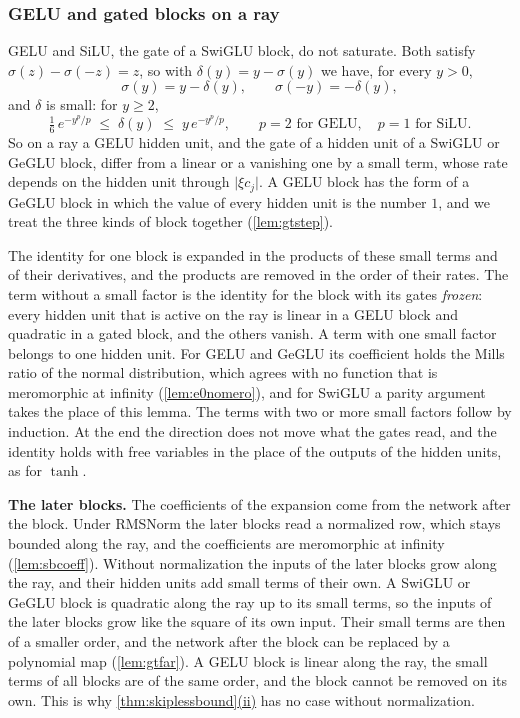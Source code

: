 \documentclass[10pt]{article}
\theoremstyle{definition}
\theoremstyle{remark}
\newcommand{\para}[1]{\smallskip\noindent\textbf{#1}\hspace{0.5em}}
\DeclareRobustCommand{\cpref}[2]{\hyperref[#1:#2]{\cref*{#1}(#2)}}
\begin{document}
\subsubsection*{GELU and gated blocks on a ray}

GELU and SiLU, the gate of a SwiGLU block, do not saturate. Both satisfy $\sigma(z) - \sigma(-z) = z$, so with $\delta(y) = y - \sigma(y)$ we have, for every $y > 0$,
\[
\sigma(y) = y - \delta(y), \qquad \sigma(-y) = -\delta(y),
\]
and $\delta$ is small: for $y \ge 2$,
\[
\tfrac16\,e^{-y^p/p} \;\le\; \delta(y) \;\le\; y\,e^{-y^p/p}, \qquad p = 2 \text{ for GELU}, \quad p = 1 \text{ for SiLU} .
\]
So on a ray a GELU hidden unit, and the gate of a hidden unit of a SwiGLU or GeGLU block, differ from a linear or a vanishing one by a small term, whose rate depends on the hidden unit through $\lvert\xi c_j\rvert$. A GELU block has the form of a GeGLU block in which the value of every hidden unit is the number $1$, and we treat the three kinds of block together (\cref{lem:gtstep}).

The identity for one block is expanded in the products of these small terms and of their derivatives, and the products are removed in the order of their rates. The term without a small factor is the identity for the block with its gates \emph{frozen}: every hidden unit that is active on the ray is linear in a GELU block and quadratic in a gated block, and the others vanish. A term with one small factor belongs to one hidden unit. For GELU and GeGLU its coefficient holds the Mills ratio of the normal distribution, which agrees with no function that is meromorphic at infinity (\cref{lem:e0nomero}), and for SwiGLU a parity argument takes the place of this lemma. The terms with two or more small factors follow by induction. At the end the direction does not move what the gates read, and the identity holds with free variables in the place of the outputs of the hidden units, as for $\tanh$.

\para{The later blocks.} The coefficients of the expansion come from the network after the block. Under RMSNorm the later blocks read a normalized row, which stays bounded along the ray, and the coefficients are meromorphic at infinity (\cref{lem:sbcoeff}). Without normalization the inputs of the later blocks grow along the ray, and their hidden units add small terms of their own. A SwiGLU or GeGLU block is quadratic along the ray up to its small terms, so the inputs of the later blocks grow like the square of its own input. Their small terms are then of a smaller order, and the network after the block can be replaced by a polynomial map (\cref{lem:gtfar}). A GELU block is linear along the ray, the small terms of all blocks are of the same order, and the block cannot be removed on its own. This is why \cpref{thm:skiplessbound}{ii} has no case without normalization.
\end{document}
